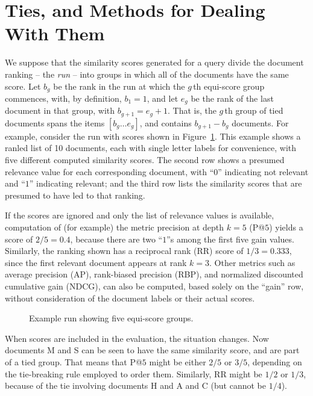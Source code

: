 \section{Ties, and Methods for Dealing With Them}
\label{sec-ties}


We suppose that the similarity scores generated for a query divide
the document ranking -- the {\emph{run}} -- into groups in which all
of the documents have the same score.
Let $b_g$ be the rank in the run at which the $g$\,th equi-score
group commences, with, by definition, $b_1=1$, and let $e_g$ be the
rank of the last document in that group, with $b_{g+1}=e_g+1$.
That is, the $g$\,th group of tied documents spans the items
$[b_g\ldots e_g]$, and contains $b_{g+1}-b_g$ documents.
For example, consider the run with scores shown in
Figure~\ref{fig-example}.
This example shows a ranled list of 10 documents, each with 
single letter labels for convenience, with
five different computed similarity scores.
The second row shows a presumed relevance value for each
corresponding document, with ``$0$'' indicating not relevant and
``$1$'' indicating relevant; and the third row lists the similarity
scores that are presumed to have led to that ranking.

If the scores are ignored and only the list of relevance values is
available, computation of (for example) the metric precision at depth
$k=5$ (P@$5$) yields a score of $2/5=0.4$, because there are two
``$1$''s among the first five gain values.
Similarly, the ranking shown has a reciprocal rank (RR) score of
$1/3=0.333$, since the first relevant document appears at rank $k=3$.
Other metrics such as average precision (AP), rank-biased precision
(RBP), and normalized discounted cumulative gain (NDCG), can also be
computed, based solely on the ``gain'' row, without consideration of
the document labels or their actual scores.

\begin{figure}[t]
\centering

\caption{Example run showing five equi-score groups.
\label{fig-example}}
\end{figure}

When scores are included in the evaluation, the situation changes.
Now documents M and S can be seen to have the same similarity score,
and are part of a tied group.
That means that P@$5$ might be either $2/5$ or $3/5$, depending on
the tie-breaking rule employed to order them.
Similarly, RR might be $1/2$ or $1/3$, because of the tie involving
documents H and A and C (but cannot be $1/4$).

